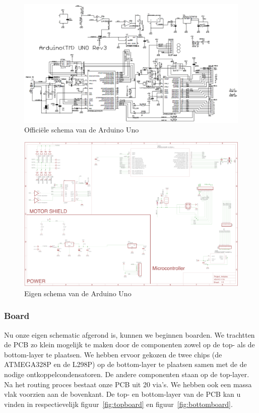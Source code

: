 \begin{figure}[H]
	\centering
	\includegraphics[width=\textheight, angle=90]{arduino-uno-r3-schematic.png}
	\caption{Offici\"{e}le schema van de Arduino Uno\label{fig:ardsch}}
\end{figure}

\begin{figure}[H]
	\centering
	\includegraphics[width=\textheight, angle=90]{eigenschematic.png}
	\caption{Eigen schema van de Arduino Uno\label{fig:eigensch}}
\end{figure}

\subsubsection{Board}
Nu onze eigen schematic afgerond is, kunnen we beginnen boarden. We trachtten de PCB zo klein mogelijk te maken door de componenten zowel op de top- als de bottom-layer te plaatsen. We hebben ervoor gekozen de twee chips (de ATMEGA328P en de L298P) op de bottom-layer te plaatsen samen met de de nodige ontkoppelcondensatoren. De andere componenten staan op de top-layer. Na het routing proces bestaat onze PCB uit 20 via's. We hebben ook een massa vlak voorzien aan de bovenkant. De top- en bottom-layer van de PCB kan u vinden in respectievelijk figuur~\vref{fig:topboard} en figuur~\vref{fig:bottomboard}.

